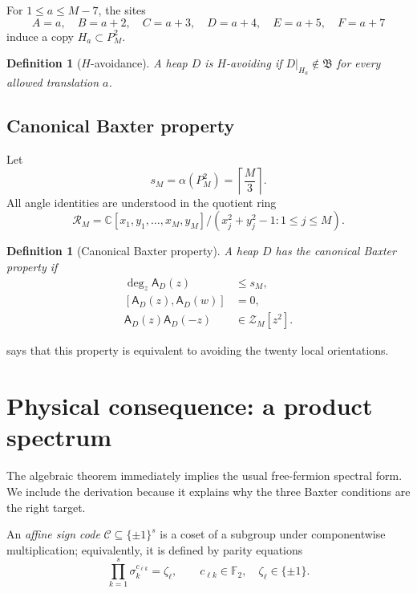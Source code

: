 \documentclass[10pt,letterpaper]{article}
\newtheorem{definition}[theorem]{Definition}
\newcommand{\Zalg}{\mathcal Z}
\newcommand{\FF}{\mathbb F_2}
\newcommand{\cA}{\mathsf A}
\begin{document}
For \(1\le a\le M-7\), the sites
\begin{equation}\label{eq:H-translate}
 A=a,
 \quad B=a+2,
 \quad C=a+3,
 \quad D=a+4,
 \quad E=a+5,
 \quad F=a+7
\end{equation}
induce a copy \(H_a\subset P_M^2\).

\begin{definition}[\(H\)-avoidance]
A heap \(D\) is \(H\)-avoiding if \(D|_{H_a}\notin\mathfrak B\) for every allowed translation \(a\).
\end{definition}

\subsection{Canonical Baxter property}

Let
\begin{equation}\label{eq:sM}
 s_M=\alpha(P_M^2)=\left\lceil\frac M3\right\rceil.
\end{equation}
All angle identities are understood in the quotient ring
\begin{equation}\label{eq:angle-ring}
 \mathscr R_M=
 \mathbb C[x_1,y_1,\ldots,x_M,y_M]
 /(x_j^2+y_j^2-1:1\le j\le M).
\end{equation}

\begin{definition}[Canonical Baxter property]\label{def:baxter}
A heap \(D\) has the canonical Baxter property if
\begin{align}
 \deg_z\cA_D(z)&\le s_M,\label{eq:bax-degree}\\
 [\cA_D(z),\cA_D(w)]&=0,\label{eq:bax-comm}\\
 \cA_D(z)\cA_D(-z)&\in\Zalg_M[z^2].\label{eq:bax-inv}
\end{align}
\end{definition}

 says that this property is equivalent to avoiding the twenty local orientations.

\section{Physical consequence: a product spectrum}\label{sec:spectrum}

The algebraic theorem immediately implies the usual free-fermion spectral form.  We include the derivation because it explains why the three Baxter conditions are the right target.

An \emph{affine sign code} \(\mathcal C\subseteq\{\pm1\}^s\) is a coset of a subgroup under componentwise multiplication; equivalently, it is defined by parity equations
\[
 \prod_{k=1}^s\sigma_k^{c_{\ell k}}=\zeta_\ell,
 \qquad c_{\ell k}\in\FF,
 \quad \zeta_\ell\in\{\pm1\}.
\]
\end{document}
